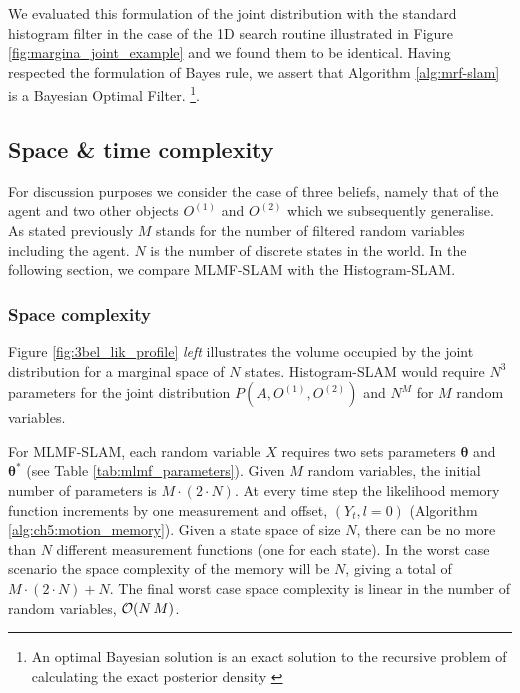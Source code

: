 We evaluated this formulation of the joint distribution with the standard histogram filter in the case of the 1D search routine 
illustrated in Figure \ref{fig:margina_joint_example} and we found them to be identical. Having respected the formulation of Bayes rule, we
assert that Algorithm \ref{alg:mrf-slam} is a Bayesian Optimal Filter.
\footnote{An optimal Bayesian solution is an exact solution to the recursive problem of calculating the exact posterior density 
\cite{PF_tutorial_2002}}.

\subsection{Space \& time complexity}\label{ch5:space_time_complexity_MLMF}

For discussion purposes we consider the case of three beliefs, namely that of the agent and two other objects $O^{(1)}$ and $O^{(2)}$ which we
subsequently generalise. As stated previously $M$ stands for the number of filtered random variables including the agent. 
$N$ is the number of discrete states in the world. In the following section, we compare MLMF-SLAM with the Histogram-SLAM.



\subsubsection{Space complexity}

Figure \ref{fig:3bel_lik_profile} \textit{left} illustrates the volume occupied by the joint distribution for a marginal space of $N$ states. 
Histogram-SLAM would require $N^3$ parameters for the joint distribution $P(A,O^{(1)},O^{(2)})$ and $N^{M}$ for $M$ random variables. 

For MLMF-SLAM, each random variable $X$ requires two sets parameters $\boldsymbol{\theta}$ and $\boldsymbol{\theta}^*$ 
(see Table \ref{tab:mlmf_parameters}). Given
$M$ random variables, the initial number of parameters is $M \cdot (2 \cdot N)$.
At every time step the likelihood memory function increments by one measurement and offset, $(Y_t,l=0)$ (Algorithm \ref{alg:ch5:motion_memory}).
Given a state space of size $N$, there can be no more than $N$ different measurement functions (one for each state). In
the worst case scenario the space complexity of the memory will be $N$, giving a total of $M \cdot (2 \cdot N) + N$. 
The final worst case space complexity is linear in the number of random variables, $\operatorname{\mathcal{O}}(N\,M)$. 

